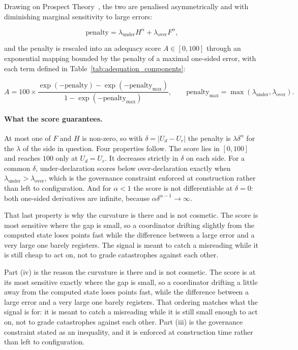 Drawing on Prospect Theory~\autocite{kahneman1979prospect}, the two are penalised
asymmetrically and with diminishing marginal sensitivity to large errors:

\begin{equation}
    \text{penalty} = \lambda_{\text{under}} H^{\alpha} + \lambda_{\text{over}} F^{\alpha},
    \label{eq:penalty}
\end{equation}

and the penalty is rescaled into an adequacy score $A \in [0, 100]$ through an exponential
mapping bounded by the penalty of a maximal one-sided error, with each term defined in
Table~\ref{tab:adequation_components}:

\begin{equation}
    A = 100 \times \frac{\exp(-\text{penalty}) - \exp(-\text{penalty}_{\max})}
    {1 - \exp(-\text{penalty}_{\max})}, \qquad
    \text{penalty}_{\max} = \max(\lambda_{\text{under}}, \lambda_{\text{over}}).
    \label{eq:At}
\end{equation}

\paragraph{What the score guarantees.}
\label{prop:adequacy}
At most one of $F$ and $H$ is non-zero, so with $\delta = |U_d - U_r|$ the penalty is
$\lambda\delta^{\alpha}$ for the $\lambda$ of the side in question. Four properties follow.
The score lies in $[0,100]$ and reaches $100$ only at $U_d = U_r$. It decreases strictly in
$\delta$ on each side. For a common $\delta$, under-declaration scores below over-declaration
exactly when $\lambda_{\text{under}} > \lambda_{\text{over}}$, which is the governance
constraint enforced at construction rather than left to configuration. And for $\alpha < 1$
the score is not differentiable at $\delta = 0$: both one-sided derivatives are infinite,
because $\alpha\delta^{\alpha-1} \to \infty$.

That last property is why the curvature is there and is not cosmetic. The score is most
sensitive where the gap is small, so a coordinator drifting slightly from the computed state
loses points fast while the difference between a large error and a very large one barely
registers. The signal is meant to catch a misreading while it is still cheap to act on, not
to grade catastrophes against each other.

Part (iv) is the reason the curvature is there and is not cosmetic. The score is at its most
sensitive exactly where the gap is small, so a coordinator drifting a little away from the
computed state loses points fast, while the difference between a large error and a very large
one barely registers. That ordering matches what the signal is for: it is meant to catch a
misreading while it is still small enough to act on, not to grade catastrophes against each
other. Part (iii) is the governance constraint stated as an inequality, and it is enforced at
construction time rather than left to configuration.

